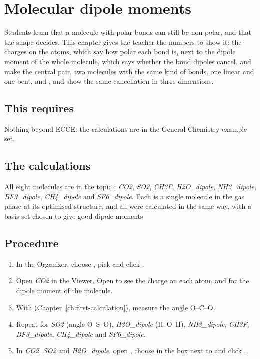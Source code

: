 \chapter{Molecular dipole moments}
\label{ch:t-dipoles}

Students learn that a molecule with polar bonds can still be non-polar, and that the shape decides. This chapter gives the teacher the numbers to show it: the charges on the atoms, which say how polar each bond is, next to the dipole moment of the whole molecule, which says whether the bond dipoles cancel.  and  make the central pair, two molecules with the same kind of bonds, one linear and one bent, and ,  and  show the same cancellation in three dimensions.

\section*{This requires}
Nothing beyond ECCE: the calculations are in the General Chemistry example set.

\section{The calculations}
All eight molecules are in the topic : \emph{CO2}, \emph{SO2}, \emph{CH3F}, \emph{H2O\_dipole}, \emph{NH3\_dipole}, \emph{BF3\_dipole}, \emph{CH4\_dipole} and \emph{SF6\_dipole}. Each is a single molecule in the gas phase at its optimised structure, and all were calculated in the same way, with a basis set chosen to give good dipole moments.

\section{Procedure}
\begin{enumerate}
	\item In the Organizer, choose , pick  and click .
	\item Open \emph{CO2} in the Viewer. Open  to see the charge on each atom, and  for the dipole moment of the molecule.
	\item With  (Chapter~\ref{ch:first-calculation}), measure the angle O--C--O.
	\item Repeat for \emph{SO2} (angle O--S--O), \emph{H2O\_dipole} (H--O--H), \emph{NH3\_dipole}, \emph{CH3F}, \emph{BF3\_dipole}, \emph{CH4\_dipole} and \emph{SF6\_dipole}.
	\item In \emph{CO2}, \emph{SO2} and \emph{H2O\_dipole}, open , choose  in the box next to  and click .
\end{enumerate}


